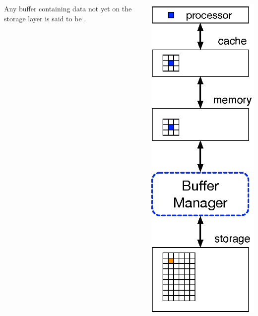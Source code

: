 \begin{frame}
\begin{columns}[onlytextwidth]
\begin{column}{0.75\textwidth}
Any buffer containing data not yet on the storage layer is said to be .
\end{column}
\begin{column}{0.2\textwidth}
\includegraphics[width=\textwidth]{./figures/buffer_manager_2}
\end{column}
\end{columns}
\end{frame}


